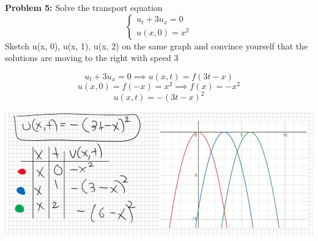 \documentclass[12pt]{article}
\newcommand{\ans}[1]{\boxed{\text{#1}}}
\begin{document}
\pagebreak
\textbf{Problem 5:} Solve the transport equation 
\[\begin{cases}
    u_t + 3u_x = 0\\
    u(x, 0) = x^2
\end{cases}\]
Sketch u(x, 0), u(x, 1), u(x, 2) on the same graph and convince yourself that the solutions are moving to the right with speed 3

\color{blue}
\[u_t + 3u_x = 0 \implies u(x, t) = f(3t - x)\]
\[u(x, 0) = f(-x) = x^2 \implies f(x) = -x^2\]
\[\ans{$u(x, t) = -(3t - x)^2$}\]

\begin{center}
    \includegraphics[width=\textwidth]{Images/transport.png}
\end{center}
\color{black}
\end{document}
